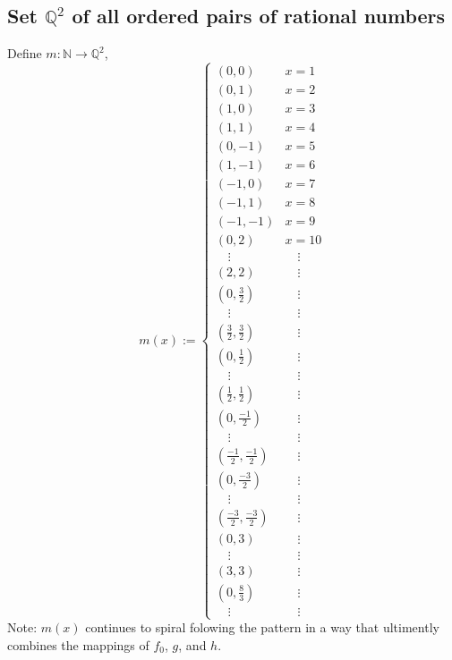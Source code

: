 \documentclass[]{article}
\newcommand{\N}{\mathbb{N}}
\newcommand{\Q}{\mathbb{Q}}
\begin{document}
\subsection{Set $\Q^2$ of all ordered pairs of rational numbers}
Define $m : \N \to \Q^2$,
\begin{displaymath}
	m(x) :=
	\begin{cases}
		(0,0)	&x=1\\
		(0,1)	&x=2\\
		(1,0)	&x=3\\
		(1,1)	&x=4\\
		(0,-1)	&x=5\\
		(1,-1)	&x=6\\
		(-1,0)	&x=7\\
		(-1,1)	&x=8\\
		(-1,-1)	&x=9\\
		(0,2)	&x=10\\
		\quad \vdots &\quad \vdots\\
		(2,2)	&\quad \vdots\\
		(0,\frac{3}{2}) &\quad \vdots\\
		\quad \vdots	&\quad \vdots\\
		(\frac{3}{2},\frac{3}{2}) &\quad \vdots\\
		(0,\frac{1}{2}) &\quad \vdots\\
		\quad \vdots	&\quad \vdots\\
		(\frac{1}{2},\frac{1}{2}) &\quad \vdots\\
		(0,\frac{-1}{2}) &\quad \vdots\\
		\quad \vdots	&\quad \vdots\\
		(\frac{-1}{2},\frac{-1}{2}) &\quad \vdots\\
		(0,\frac{-3}{2}) &\quad \vdots\\
		\quad \vdots	&\quad \vdots\\
		(\frac{-3}{2},\frac{-3}{2}) &\quad \vdots\\
		(0,3)	&\quad \vdots\\
		\quad \vdots &\quad \vdots\\
		(3,3)	&\quad \vdots\\
		(0, \frac{8}{3})	&\quad \vdots\\
		\quad \vdots	&\quad \vdots
	\end{cases}
\end{displaymath}
Note: $m(x)$ continues to spiral folowing the pattern in a way that ultimently
combines the mappings of $f_0$, $g$, and $h$.\\
\end{document}

